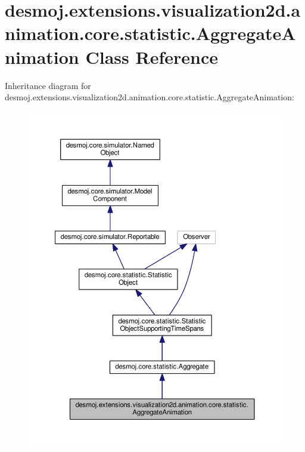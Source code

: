 \section{desmoj.\-extensions.\-visualization2d.\-animation.\-core.\-statistic.\-Aggregate\-Animation Class Reference}
\label{classdesmoj_1_1extensions_1_1visualization2d_1_1animation_1_1core_1_1statistic_1_1_aggregate_animation}


Inheritance diagram for desmoj.\-extensions.\-visualization2d.\-animation.\-core.\-statistic.\-Aggregate\-Animation\-:
\nopagebreak
\begin{figure}[H]
\begin{center}
\leavevmode
\includegraphics[width=350pt]{classdesmoj_1_1extensions_1_1visualization2d_1_1animation_1_1core_1_1statistic_1_1_aggregate_animation__inherit__graph}
\end{center}
\end{figure}


